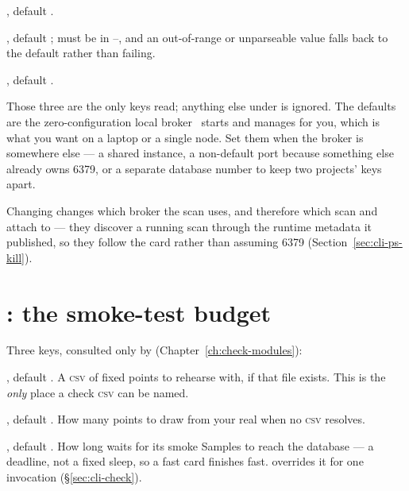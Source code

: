 \begin{keylist}
  \item[host] \opt, default .
  \item[port] \opt, default ; must be in --, and an
        out-of-range or unparseable value falls back to the default rather than failing.
  \item[db] \opt, default .
\end{keylist}

Those three are the only keys read; anything else under  is ignored. The
defaults are the zero-configuration local broker \Jtwo\ starts and manages for you, which
is what you want on a laptop or a single node. Set them when the broker is somewhere
else --- a shared instance, a non-default port because something else already owns 6379,
or a separate database number to keep two projects' keys apart.

\begin{jnote}
Changing  changes which broker the scan uses, and therefore which scan
 and  attach to --- they discover a running scan
through the runtime metadata it published, so they follow the card rather than assuming
6379 (Section~\ref{sec:cli-ps-kill}).
\end{jnote}

\section{: the smoke-test budget}
\label{sec:check-modules-settings}

Three keys, consulted only by  (Chapter~\ref{ch:check-modules}):

\begin{keylist}
  \item[data] \opt, default .
        A \textsc{csv} of fixed points to rehearse with, if that file exists. This is the
        \emph{only} place a check \textsc{csv} can be named.
  \item[n\_samples] \opt, default . How many points to draw from your real
         when no \textsc{csv} resolves.
  \item[timeout\_sec] \opt, default . How long  waits for its
        smoke Samples to reach the database --- a deadline, not a fixed sleep, so a fast
        card finishes fast.  overrides it for one invocation
        (\S\ref{sec:cli-check}).
\end{keylist}

